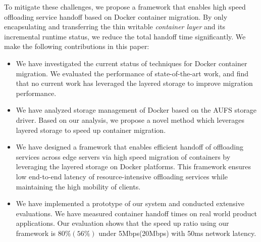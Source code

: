 %
To mitigate these challenges, we propose a framework that enables high speed offloading service handoff based on Docker container migration. By only encapsulating and transferring the thin writable \textit{container layer} and its incremental runtime status, we reduce the total handoff time significantly.
We make the following contributions in this paper:
\begin{itemize}
    
    \item We have investigated the current status of techniques for Docker container migration. 
    We evaluated the performance of state-of-the-art work, and find that no current work has leveraged the layered storage to improve migration performance.
     
    \item  We have analyzed storage management of Docker based on the AUFS storage driver. 
    Based on our analysis, we propose a novel method which leverages layered storage to speed up container migration.
    
 
     \item We have designed a framework that enables efficient handoff of offloading services across edge servers via high speed migration of containers by leveraging the layered storage on Docker platforms. This framework ensures low end-to-end latency of resource-intensive
     offloading services
     while maintaining the high mobility of clients. 
     
    \item We have implemented a prototype of our system and conducted extensive evaluations. We have measured container handoff times
    on real world product applications. Our evaluation shows that the speed up ratio using our framework is $80\%(56\%)$ under 5Mbps(20Mbps) with 50ms network latency.
    
\end{itemize}

